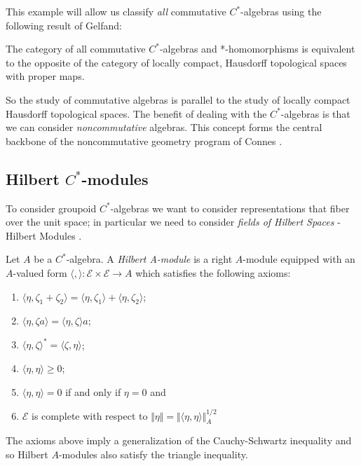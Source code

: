 This example will allow us classify \textit{all} commutative $C^{*}$-algebras using the following result of Gelfand:

\begin{theorem}
The category of all commutative $C^{*}$-algebras and *-homomorphisms is equivalent to the opposite of the category of locally compact, Hausdorff topological spaces with proper maps.
\end{theorem}

So the study of commutative algebras is parallel to the study of locally compact Hausdorff topological spaces. The benefit of dealing with the $C^{*}$-algebras is that we can consider \textit{noncommutative} algebras. This concept forms the central backbone of the noncommutative geometry program of Connes \cite{MR1826266}.

\subsection{Hilbert $C^{*}$-modules}
To consider groupoid $C^{*}$-algebras we want to consider representations that fiber over the unit space; in particular we need to consider \textit{fields of Hilbert Spaces} - Hilbert Modules \cite{MR1325694}.

\begin{definition}
Let $A$ be a $C^{*}$-algebra. A \textit{Hilbert A-module}  is a right $A$-module equipped with an $A$-valued form $\langle , \rangle: \mathscr{E} \times \mathscr{E} \rightarrow A$ which satisfies the following axioms:
\begin{enumerate}
\item $\langle \eta ,\zeta_{1} + \zeta_{2} \rangle = \langle \eta , \zeta_{1}\rangle + \langle \eta ,\zeta_{2} \rangle$;
\item $\langle \eta , \zeta a \rangle = \langle \eta ,\zeta \rangle a$;
\item $\langle \eta , \zeta \rangle^{*} = \langle \zeta ,\eta \rangle$;
\item $\langle \eta, \eta \rangle \geq 0$;
\item $\langle \eta ,\eta  \rangle = 0 $ if and only if $ \eta = 0$ and
\item $\mathscr{E}$ is complete with respect to $\Vert \eta \Vert = \Vert \langle \eta , \eta \rangle \Vert_{A}^{1/2}$
\end{enumerate}
\end{definition}

\begin{remark}
The axioms above imply a generalization of the Cauchy-Schwartz inequality and so Hilbert $A$-modules also satisfy the triangle inequality.
\end{remark}

